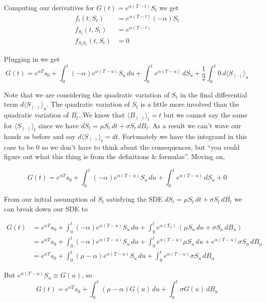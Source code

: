 \documentclass[12pt]{article}
\newlength\tindent
\renewcommand{\indent}{\hspace*{\tindent}}
\begin{document}
Computing our derivatives for $G(t) = e^{\alpha(T-t)}S_t$ we get
\begin{align*}
	f_t(t,S_t) &= e^{\alpha(T-t)}(-\alpha)S_t \\
	f_{S_t}(t,S_t) &= e^{\alpha(T-t)} \\
	f_{S_tS_t}(t,S_t) &= 0
\end{align*}

Plugging in we get
\begin{equation*}
	G(t) = e^{\alpha T}s_0 + \int^t_0 (-\alpha)e^{\alpha(T-u)}S_u\,du + \int^t_0 e^{\alpha(T - u)}\,dS_u + \frac{1}{2}\int^t_0 0\,d\langle S_{(\cdot)}\rangle_u
\end{equation*}

\indent Note that we are considering the quadratic variation of $S_t$ in the final differential term $d\langle S_{(\cdot)}\rangle_u$. The quadratic variation of $S_t$ is a little more involved than the quadratic variation of $B_t$. We know that $\langle B_{(\cdot)}\rangle_t = t$ but we cannot say the same for $\langle S_{(\cdot)}\rangle_t$ since we have $dS_t = \mu S_t\,dt + \sigma S_t\,dB_t$. As a result we can't wave our hands as before and say $d\langle S_{(\cdot)}\rangle_t = dt$. Fortunately we have the integrand in this case to be 0 so we don't have to think about the consequences, but ``you could figure out what this thing is from the definitions \& formulas''. Moving on,

\begin{equation*}
		G(t) = e^{\alpha T}s_0 + \int^t_0 (-\alpha)e^{\alpha(T-u)}S_u\,du + \int^t_0 e^{\alpha(T - u)}\,dS_u + 0
\end{equation*}

\indent From our initial assumption of $S_t$ satisfying the SDE $dS_t = \mu S_t\,dt + \sigma S_t\,dB_t$ we can break down our SDE to

\begin{align*}
	G(t) &= e^{\alpha T}s_0 + \int^t_0 (-\alpha)e^{\alpha(T-u)}S_u\,du + \int^t_0 e^{\alpha(T_u)}\,(\mu S_u\,du + \sigma S_u\,dB_u) \\
	&= e^{\alpha T}s_0 + \int^t_0 (-\alpha)e^{\alpha(T-u)}S_u\,du + \int^t_0 e^{\alpha(T - u)}\mu S_u\,du + e^{\alpha(T - u)}\sigma S_u\,dB_u \\
	&= e^{\alpha T}s_0 + \int^t_0 (\mu -\alpha)e^{\alpha(T-u)}S_u\,du + \int^t_0 e^{\alpha(T - u)}\sigma S_u\,dB_u
\end{align*}

But $e^{\alpha(T-u)}S_u \equiv G(u)$, so
\begin{equation*}
	G(t) = e^{\alpha T}s_0 + \int^t_0 (\mu -\alpha)G(u)\,du + \int^t_0 \sigma G(u)\,dB_u
\end{equation*}
\\
\end{document}
